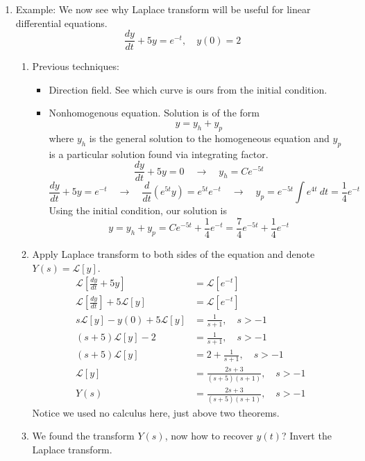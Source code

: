 \documentclass{article}
\begin{document}
\begin{enumerate}
\item Example: We now see why Laplace transform will be useful for linear differential equations. 
\[
\frac{dy}{dt} +5y = e^{-t}, \quad y(0)=2
\]
\begin{enumerate}
\item Previous techniques:
\begin{itemize}
\item Direction field. See which curve is ours from the initial condition.
\item Nonhomogenous equation. Solution is of the form
\[
y = y_h + y_p
\]
where $y_h$ is the general solution to the homogeneous equation and $y_p$ is a particular solution found via integrating factor.
\[
\frac{dy}{dt} +5y = 0 \quad \rightarrow \quad y_h = C e^{-5t}
\]
\[
\frac{dy}{dt} +5y = e^{-t} \quad \rightarrow \quad 
\frac{d}{dt}(e^{5t}y) = e^{5t}e^{-t} \quad \rightarrow \quad 
y_p = e^{-5t} \int e^{4t}~dt = \frac{1}{4} e^{-t}
\]
Using the initial condition, our solution is
\[
y = y_h+y_p = Ce^{-5t}+\frac{1}{4}e^{-t} = \frac{7}{4} e^{-5t}+\frac{1}{4}e^{-t}
\]
\end{itemize}
\item Apply Laplace transform to both sides of the equation and denote $Y(s) = \mathcal{L}[y]$.
\begin{align*}
\mathcal{L}\left[\frac{dy}{dt} +5y\right] &= \mathcal{L}\left[e^{-t}\right] \\
\mathcal{L}\left[\frac{dy}{dt}\right] +5 \mathcal{L}\left[y\right] &= \mathcal{L}\left[e^{-t}\right] \\
s\mathcal{L}\left[y\right]-y(0) +5 \mathcal{L}\left[y\right] &= \frac{1}{s+1}, \quad s > -1 \\
(s+5)\mathcal{L}\left[y\right]-2 &= \frac{1}{s+1}, \quad s > -1 \\
(s+5)\mathcal{L}\left[y\right] &= 2+\frac{1}{s+1}, \quad s > -1 \\
\mathcal{L}\left[y\right] &= \frac{2s+3}{(s+5)(s+1)}, \quad s > -1  \\
Y(s) &= \frac{2s+3}{(s+5)(s+1)}, \quad s > -1 
\end{align*}
Notice we used no calculus here, just above two theorems.
\item We found the transform $Y(s)$, now how to recover $y(t)$? Invert the Laplace transform.
\end{enumerate}


\end{enumerate}
\end{document}
